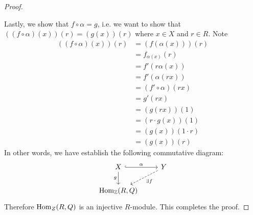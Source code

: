 \begin{proof}
\begin{itemize}
    \end{itemize}
    Lastly, we show that $f\circ \alpha= g$, i.e. we want to show that $((f\circ \alpha)(x))(r) = (g(x))(r)$ where $x\in X$ and $r\in R$. Note 
    \begin{align*}
        ((f\circ \alpha)(x))(r) 
        &= (f(\alpha(x)))(r) \\
        &= f_{\alpha(x)}(r) \\
        &= f'(r\alpha(x))\\
        &= f'(\alpha(rx)) \\
        &=(f'\circ \alpha)(rx) \\
        &= g'(rx)\\
        &= (g(rx))(1)\\
        &= (r\cdot g(x))(1) \\
        &= (g(x))(1\cdot r)\\
        &= (g(x)) (r)
    \end{align*}
    In other words, we have establish the following commutative diagram:
    \[\begin{tikzcd} [sep = small]
	X && Y \\
	\\
	{\h_\Z(R,Q)}
	\arrow["\alpha", hook, from=1-1, to=1-3]
	\arrow["g"', from=1-1, to=3-1]
	\arrow["\exists f", dashed, from=1-3, to=3-1]
    \end{tikzcd}\]
    Therefore $\operatorname{Hom}_Z(R,Q)$ is an injective $R$-module. This completes the proof.
\end{proof}



